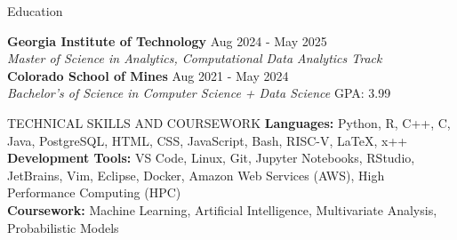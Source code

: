 \documentclass{resume} %
\begin{document}
\vspace{-10pt}

\begin{rSection}{Education}

{\bf Georgia Institute of Technology} \hfill {Aug 2024 - May 2025}\\
\textit{Master of Science in Analytics, Computational Data Analytics Track} \\ [1em]
{\bf Colorado School of Mines} \hfill {Aug 2021 - May 2024}\\
\textit{Bachelor's of Science in Computer Science + Data Science} \hfill {GPA: 3.99}\\


\end{rSection}
\vspace{-18pt}

\begin{rSection}{TECHNICAL SKILLS AND COURSEWORK}
   \textbf{Languages:} Python, R, C++, C, Java, PostgreSQL, HTML, CSS, JavaScript, Bash, RISC-V, LaTeX, x++\\
   \textbf{Development Tools:} VS Code, Linux, Git, Jupyter Notebooks, RStudio, JetBrains, Vim, Eclipse, Docker, Amazon Web Services (AWS), High Performance Computing (HPC) \\
   \textbf{Coursework:} Machine Learning, Artificial Intelligence, Multivariate Analysis, Probabilistic Models
   \end{rSection}
   \vspace{-6pt}
\end{document}
